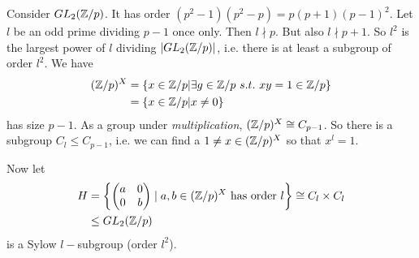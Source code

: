 \documentclass[a4paper]{article}
\begin{document}
\begin{eg}
Consider $GL_2(\mathbb{Z}/p)$. It has order $(p^2-1)(p^2-p) = p(p+1)(p-1)^2$. Let $l$ be an odd prime dividing $p-1$ once only. Then $l \nmid p$. But also $l \nmid p+1$. So $l^2$ is the largest power of $l$ dividing $|GL_2(\mathbb{Z}/p)|$, i.e. there is at least a subgroup of order $l^2$. We have
\begin{equation*}
\begin{aligned}
(\mathbb{Z}/p)^X &= \{ x \in \mathbb{Z}/p | \exists g \in \mathbb{Z}/p \ s.t. \ xy=1 \in \mathbb{Z}/p\}\\
&= \{x \in \mathbb{Z} /p | x\neq 0\}
\end{aligned}
\end{equation*}
has size $p-1$. As a group under \emph{multiplication}, $(\mathbb{Z}/p)^X \cong C_{p-1}$. So there is a subgroup $C_l \leq C_{p-1}$, i.e. we can find a $1 \neq x \in (\mathbb{Z}/p)^X$ so that $x^l=1$.

Now let 
\begin{equation*}
\begin{aligned}
H &= \left\{ \left(\begin{matrix}
a & 0\\
0 & b
\end{matrix}\right) \mid a,b \in (\mathbb{Z}/p)^X \text{ has order } l \right\} \cong C_l \times C_l\\
&\leq GL_2(\mathbb{Z}/p)
\end{aligned}
\end{equation*}
is a Sylow $l-$subgroup (order $l^2$).
\end{eg}
\end{document}
